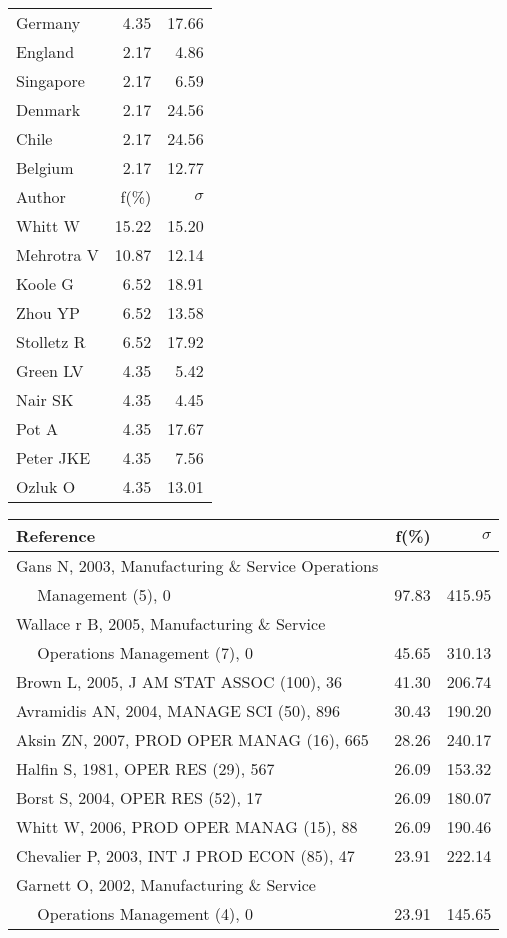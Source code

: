 \documentclass[a4paper,11pt]{report}
\begin{document}
\begin{landscape}
\begin{table}[!ht]
{\begin{tabular}{|l r r|}
Germany & 4.35 & 17.66\\
England & 2.17 & 4.86\\
Singapore & 2.17 & 6.59\\
Denmark & 2.17 & 24.56\\
Chile & 2.17 & 24.56\\
Belgium & 2.17 & 12.77\\
\hline
\hline
Author & f(\%) & $\sigma$\\
\hline
Whitt W & 15.22 & 15.20\\
Mehrotra V & 10.87 & 12.14\\
Koole G & 6.52 & 18.91\\
Zhou YP & 6.52 & 13.58\\
Stolletz R & 6.52 & 17.92\\
Green LV & 4.35 & 5.42\\
Nair SK & 4.35 & 4.45\\
Pot A & 4.35 & 17.67\\
Peter JKE & 4.35 & 7.56\\
Ozluk O & 4.35 & 13.01\\
\hline
\end{tabular}
}
{\scriptsize\begin{tabular}{|l r r|}
\hline
Reference & f(\%) & $\sigma$\\
\hline
Gans N, 2003, Manufacturing \& Service Operations &  & \\
$\quad$ Management (5), 0 & 97.83 & 415.95\\
Wallace r B, 2005, Manufacturing \& Service &  & \\
$\quad$ Operations Management (7), 0 & 45.65 & 310.13\\
Brown L, 2005, J AM STAT ASSOC (100), 36 & 41.30 & 206.74\\
Avramidis AN, 2004, MANAGE SCI (50), 896 & 30.43 & 190.20\\
Aksin ZN, 2007, PROD OPER MANAG (16), 665 & 28.26 & 240.17\\
Halfin S, 1981, OPER RES (29), 567 & 26.09 & 153.32\\
Borst S, 2004, OPER RES (52), 17 & 26.09 & 180.07\\
Whitt W, 2006, PROD OPER MANAG (15), 88 & 26.09 & 190.46\\
Chevalier P, 2003, INT J PROD ECON (85), 47 & 23.91 & 222.14\\
Garnett O, 2002, Manufacturing \& Service &  & \\
$\quad$ Operations Management (4), 0 & 23.91 & 145.65\\

\end{tabular}}
\end{table}
\end{landscape}
\end{document}
